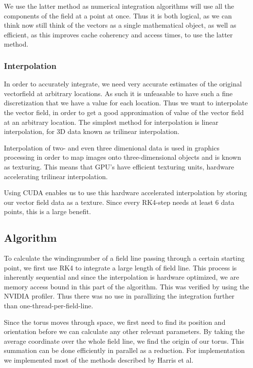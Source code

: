 \documentclass{article}
\begin{document}
We use the latter method as numerical integration algorithms will use all the components of the field at a point at once. %
Thus it is both logical, as we can think now still think of the vectors as a single mathematical object, as well as efficient, as this improves cache coherency and access times, to use the latter method.

\subsubsection{Interpolation}
In order to accurately integrate, we need very accurate estimates of the original vectorfield at arbitrary locations. As such it is unfeasable to have such a fine discretization that we have a value for each location. 
Thus we want to interpolate the vector field, in order to get a good approximation of value of the vector field at an arbitrary location. The simplest method for interpolation is linear interpolation, for 3D data known as trilinear interpolation.

Interpolation of two- and even three dimenional data is used in graphics processing in order to map images onto three-dimensional objects and is known as texturing. This means that GPU's have efficient texturing units, hardware accelerating trilinear interpolation. 

Using CUDA enables us to use this hardware accelerated interpolation by storing our vector field data as a texture. Since every RK4-step needs at least 6 data points, this is a large benefit. %
\subsection{Algorithm}
To calculate the windingnumber of a field line passing through a certain starting point, we first use RK4 to integrate a large length of field line. This process is inherently sequential and since the interpolation is hardware optimized, we are memory access bound in this part of the algorithm. This was verified by using the NVIDIA profiler. Thus there was no use in parallizing the integration further than one-thread-per-field-line.

Since the torus moves through space, we first need to find its position and orientation before we can calculate any other relevant parameters.
By taking the average coordinate over the whole field line, we find the origin of our torus. This summation can be done efficiently in parallel as a reduction. For implementation we implemented most of the methods described by Harris et al.~\cite{harris2007optimizing}
\end{document}
